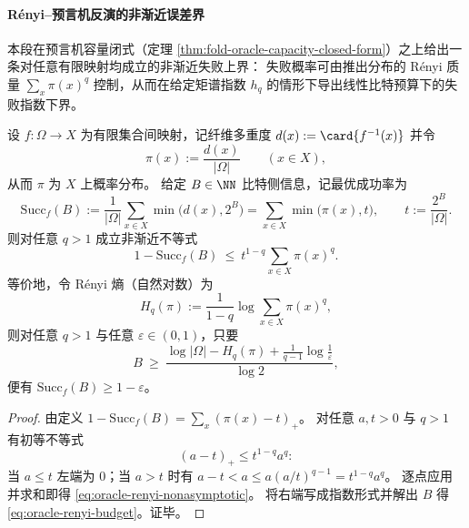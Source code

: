 
\paragraph{R\'enyi--预言机反演的非渐近误差界}\label{par:fold-oracle-renyi-nonasymptotic}
本段在预言机容量闭式（定理 \ref{thm:fold-oracle-capacity-closed-form}）之上给出一条对任意有限映射均成立的非渐近失败上界：
失败概率可由推出分布的 R\'enyi 质量 \(\sum_x\pi(x)^q\) 控制，从而在给定矩谱指数 \(h_q\) 的情形下导出线性比特预算下的失败指数下界。

\begin{theorem}\label{thm:oracle-renyi-nonasymptotic-error-bound}
设 \(f:\Omega\to X\) 为有限集合间映射，记纤维多重度 \(d(x):=\card{f^{-1}(x)}\) 并令
\[
\pi(x):=\frac{d(x)}{|\Omega|}\qquad(x\in X),
\]
从而 \(\pi\) 为 \(X\) 上概率分布。
给定 \(B\in\NN\) 比特侧信息，记最优成功率为
\[
\mathrm{Succ}_f(B):=\frac{1}{|\Omega|}\sum_{x\in X}\min\bigl(d(x),2^B\bigr)
=\sum_{x\in X}\min\bigl(\pi(x),t\bigr),
\qquad
t:=\frac{2^B}{|\Omega|}.
\]
则对任意 \(q>1\) 成立非渐近不等式
\begin{equation}\label{eq:oracle-renyi-nonasymptotic}
1-\mathrm{Succ}_f(B)\ \le\ t^{1-q}\sum_{x\in X}\pi(x)^q.
\end{equation}
等价地，令 R\'enyi 熵（自然对数）为
\[
H_q(\pi):=\frac{1}{1-q}\log\sum_{x\in X}\pi(x)^q,
\]
则对任意 \(q>1\) 与任意 \(\varepsilon\in(0,1)\)，只要
\begin{equation}\label{eq:oracle-renyi-budget}
B\ \ge\ \frac{\log|\Omega|-H_q(\pi)+\frac{1}{q-1}\log\frac{1}{\varepsilon}}{\log 2},
\end{equation}
便有 \(\mathrm{Succ}_f(B)\ge 1-\varepsilon\)。
\end{theorem}
\begin{proof}
由定义 \(1-\mathrm{Succ}_f(B)=\sum_x(\pi(x)-t)_+\)。
对任意 \(a,t>0\) 与 \(q>1\) 有初等不等式
\[
(a-t)_+\le t^{1-q}a^q:
\]
当 \(a\le t\) 左端为 \(0\)；当 \(a>t\) 时有 \(a-t<a\le a(a/t)^{q-1}=t^{1-q}a^q\)。
逐点应用并求和即得 \eqref{eq:oracle-renyi-nonasymptotic}。
将右端写成指数形式并解出 \(B\) 得 \eqref{eq:oracle-renyi-budget}。证毕。
\end{proof}

